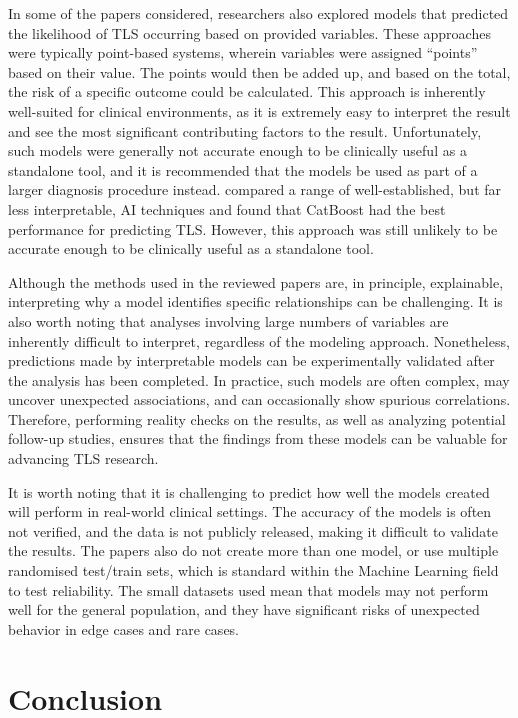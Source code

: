 \documentclass{article}
\begin{document}
In some of the papers considered, researchers also explored models that predicted the likelihood of TLS occurring based on provided variables. These approaches were typically point-based systems, wherein variables were assigned “points” based on their value. The points would then be added up, and based on the total, the risk of a specific outcome could be calculated. This approach is inherently well-suited for clinical environments, as it is extremely easy to interpret the result and see the most significant contributing factors to the result. Unfortunately, such models were generally not accurate enough to be clinically useful as a standalone tool, and it is recommended that the models be used as part of a larger diagnosis procedure instead. \cite{xiao2024prediction}  compared a range of well-established, but far less interpretable, AI techniques and found that CatBoost had the best performance for predicting TLS. However, this approach was still unlikely to be accurate enough to be clinically useful as a standalone tool.

Although the methods used in the reviewed papers are, in principle, explainable, interpreting why a model identifies specific relationships can be challenging.  It is also worth noting that analyses involving large numbers of variables are inherently difficult to interpret, regardless of the modeling approach. Nonetheless, predictions made by interpretable models can be experimentally validated after the analysis has been completed.  In practice, such models are often complex, may uncover unexpected associations, and can occasionally show spurious correlations. Therefore, performing reality checks on the results, as well as analyzing potential follow-up studies, ensures that the findings from these models can be valuable for advancing TLS research.

It is worth noting that it is challenging to predict how well the models created will perform in real-world clinical settings. The accuracy of the models is often not verified, and the data is not publicly released, making it difficult to validate the results. The papers also do not create more than one model, or use multiple randomised test/train sets, which is standard within the Machine Learning field to test reliability. The small datasets used mean that models may not perform well for the general population, and they have significant risks of unexpected behavior in edge cases and rare cases.

\section{Conclusion}
\end{document}
